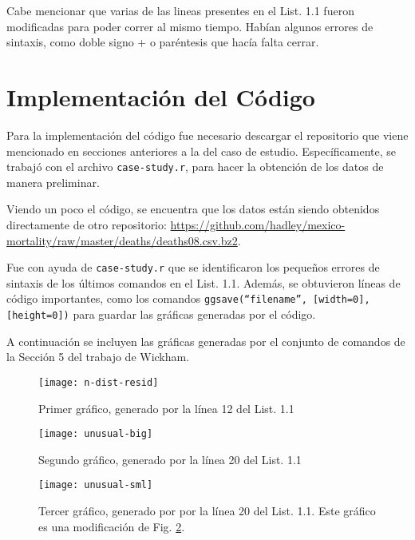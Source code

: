 \documentclass{llncs}
\begin{document}
Cabe mencionar que varias de las lineas presentes en el List. 1.1 fueron modificadas para poder correr al mismo tiempo.
Habían algunos errores de sintaxis, como doble signo + o paréntesis que hacía falta cerrar.

\section{Implementación del Código}
\label{sec:code2}

Para la implementación del código fue necesario descargar el repositorio que viene mencionado en secciones anteriores a la del caso de estudio.
Específicamente, se trabajó con el archivo \texttt{case-study.r}, para hacer la obtención de los datos de manera preliminar.

Viendo un poco el código, se encuentra que los datos están siendo obtenidos directamente de otro repositorio: \url{https://github.com/hadley/mexico-mortality/raw/master/deaths/deaths08.csv.bz2}.

Fue con ayuda de \texttt{case-study.r} que se identificaron los pequeños errores de sintaxis de los últimos comandos en el List. 1.1.
Además, se obtuvieron líneas de código importantes, como los comandos \texttt{ggsave(``filename'', [width=0], [height=0])} para guardar las gráficas generadas por el código.

A continuación se incluyen las gráficas generadas por el conjunto de comandos de la Sección 5 del trabajo de Wickham.

\begin{figure}[h!]
	\centering
	\texttt{[image: n-dist-resid]}
	\caption{Primer gráfico, generado por la línea 12 del List. 1.1}
	\label{fig:ndistresid}
\end{figure}

\begin{figure}[h!]
	\centering
	\texttt{[image: unusual-big]}
	\caption{Segundo gráfico, generado por la línea 20 del List. 1.1}
	\label{fig:unusualbig}
\end{figure}

\begin{figure}[h!]
	\centering
	\texttt{[image: unusual-sml]}
	\caption{Tercer gráfico, generado por por la línea 20 del List. 1.1. Este gráfico es una modificación de Fig. \ref{fig:unusualbig}.}
	\label{fig:unusual-sml}
\end{figure}

\pagebreak
\end{document}
